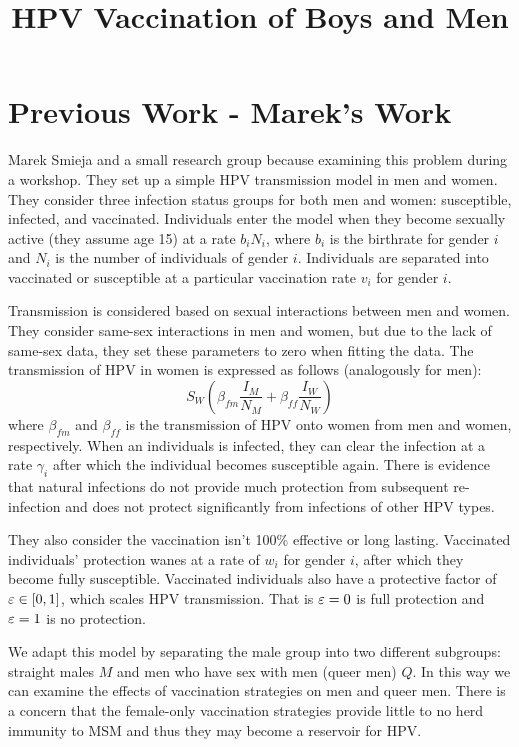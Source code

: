 \documentclass[12pt]{article}
\title{HPV Vaccination of Boys and Men}
\begin{document}
\maketitle

\section*{Previous Work - Marek's Work}

Marek Smieja and a small research group because examining this problem during a workshop.  They set up a simple HPV transmission model in men and women.  They consider three infection status groups for both men and women: susceptible, infected, and vaccinated.  Individuals enter the model when they become sexually active (they assume age 15) at a rate $b_iN_i$, where $b_i$ is the birthrate for gender $i$ and $N_i$ is the number of individuals of gender $i$.  Individuals are separated into vaccinated or susceptible at a particular vaccination rate $v_i$ for gender $i$.  

Transmission is considered based on sexual interactions between men and women.  They consider same-sex interactions in men and women, but due to the lack of same-sex data, they set these parameters to zero when fitting the data.  The transmission of HPV in women is expressed as follows (analogously for men):
\begin{equation}
S_{W}\left(\beta_{fm}\frac{I_M}{N_M} + \beta_{ff}\frac{I_W}{N_W}\right)
\end{equation}
where $\beta_{fm}$ and $\beta_{ff}$ is the transmission of HPV onto women from men and women, respectively.  When an individuals is infected, they can clear the infection at a rate $\gamma_i$ after which the individual becomes susceptible again.  There is evidence that natural infections do not provide much protection from subsequent re-infection and does not protect significantly from infections of other HPV types.  

They also consider the vaccination isn't 100\% effective or long lasting. Vaccinated individuals' protection wanes at a rate of $w_i$ for gender $i$, after which they become fully susceptible.  Vaccinated individuals also have a protective factor of $\varepsilon\in[0,1]$, which scales HPV transmission.  That is $\varepsilon=0$ is full protection and $\varepsilon=1$ is no protection.  

We adapt this model by separating the male group into two different subgroups: straight males $M$ and men who have sex with men (queer men) $Q$. In this way we can examine the effects of vaccination strategies on men and queer men.  There is a concern that the female-only vaccination strategies provide little to no herd immunity to MSM and thus they may become a reservoir for HPV. 
\end{document}
